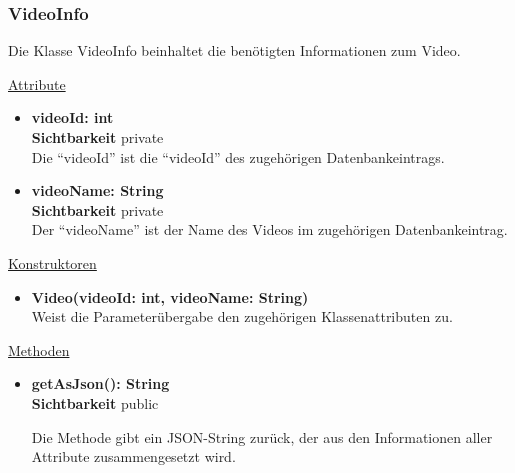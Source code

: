 \subsubsection{VideoInfo} \label{service:klasse:VideoInfo}
Die Klasse VideoInfo beinhaltet die benötigten Informationen zum Video.\newline

\underline{Attribute}
\begin{itemize}
\itemsep0pt
\item \textbf{videoId: int} \hfill\\ 
\textbf{Sichtbarkeit} private \hfill\\  

Die ``videoId'' ist die ``videoId'' des zugehörigen Datenbankeintrags.

\item \textbf{videoName: String} \hfill\\ 
\textbf{Sichtbarkeit} private \hfill\\ 

Der ``videoName'' ist der Name des Videos im zugehörigen Datenbankeintrag.

\end{itemize}

\underline{Konstruktoren}
\begin{itemize}
\itemsep0pt
\item \textbf{Video(videoId: int, videoName: String)} \hfill\\

Weist die Parameterübergabe den zugehörigen Klassenattributen zu.

\end{itemize}

\underline{Methoden}
\begin{itemize}
\itemsep0pt
\item \textbf{getAsJson(): String}\hfill\\
\textbf{Sichtbarkeit} public

Die Methode gibt ein JSON-String zurück, der aus den Informationen aller Attribute zusammengesetzt wird.

\end{itemize}